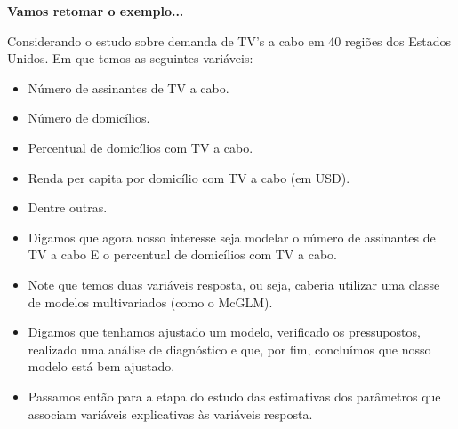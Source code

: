 \documentclass[10pt,
  aspectratio=169,
  serif,
  mathserif,
  professionalfont,
  compress,
  handout,
  ]{beamer}\usepackage[]{graphicx}\usepackage[]{color}
\begin{document}
\begin{frame}[c, allowframebreaks]

\textbf{Vamos retomar o exemplo...}

\hspace{1cm}

Considerando o estudo sobre demanda de TV’s a cabo em 40 regiões
dos Estados Unidos. Em que temos as seguintes variáveis:

\begin{itemize}

  \item Número de assinantes de TV a cabo.

  \item Número de domicílios.

  \item Percentual de domicílios com TV a cabo.

  \item Renda per capita por domicílio com TV a cabo (em USD).

  \item Dentre outras.

\end{itemize}

\end{frame}

\begin{frame}[c, allowframebreaks]

\begin{itemize}

  \item Digamos que agora nosso interesse seja modelar o número de assinantes de TV a cabo E o percentual de domicílios com TV a cabo.

  \item Note que temos duas variáveis resposta, ou seja, caberia utilizar uma classe de modelos multivariados (como o McGLM).

  \item Digamos que tenhamos ajustado um modelo, verificado os pressupostos, realizado uma análise de diagnóstico e que, por fim, concluímos que nosso modelo está bem ajustado.

  \item Passamos então para a etapa do estudo das estimativas dos parâmetros que associam variáveis explicativas às variáveis resposta.

\end{itemize}

\end{frame}
\end{document}

